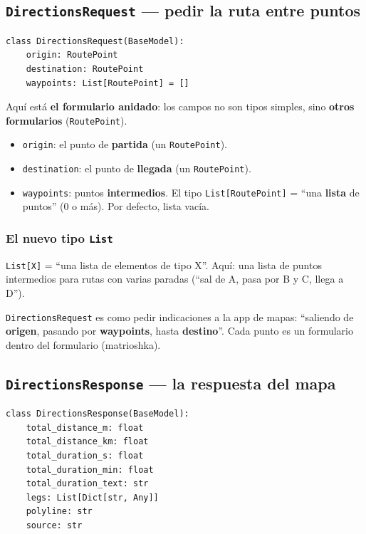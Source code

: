 \documentclass[11pt,a4paper]{article}
\begin{document}
\subsection{\texttt{DirectionsRequest} --- pedir la ruta entre puntos}

\begin{lstlisting}
class DirectionsRequest(BaseModel):
    origin: RoutePoint
    destination: RoutePoint
    waypoints: List[RoutePoint] = []
\end{lstlisting}

Aquí está \textbf{el formulario anidado}: los campos no son tipos simples, sino \textbf{otros
formularios} (\texttt{RoutePoint}).

\begin{itemize}
    \item \texttt{origin}: el punto de \textbf{partida} (un \texttt{RoutePoint}).
    \item \texttt{destination}: el punto de \textbf{llegada} (un \texttt{RoutePoint}).
    \item \texttt{waypoints}: puntos \textbf{intermedios}. El tipo \texttt{List[RoutePoint]}
    = ``una \textbf{lista} de puntos'' (0 o más). Por defecto, lista vacía.
\end{itemize}

\subsubsection{El nuevo tipo \texttt{List}}

\texttt{List[X]} = ``una lista de elementos de tipo X''. Aquí: una lista de puntos intermedios
para rutas con varias paradas (``sal de A, pasa por B y C, llega a D'').

\begin{analogia}
\texttt{DirectionsRequest} es como pedir indicaciones a la app de mapas: ``saliendo de
\textbf{origen}, pasando por \textbf{waypoints}, hasta \textbf{destino}''. Cada punto es un
formulario dentro del formulario (matrioshka).
\end{analogia}

\subsection{\texttt{DirectionsResponse} --- la respuesta del mapa}

\begin{lstlisting}
class DirectionsResponse(BaseModel):
    total_distance_m: float
    total_distance_km: float
    total_duration_s: float
    total_duration_min: float
    total_duration_text: str
    legs: List[Dict[str, Any]]
    polyline: str
    source: str
\end{lstlisting}
\end{document}
